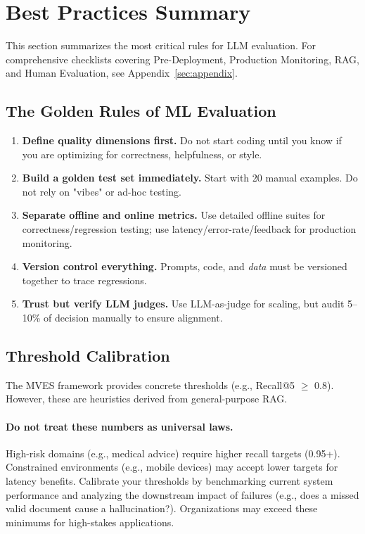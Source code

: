 \section{Best Practices Summary}
\label{sec:checklist}

This section summarizes the most critical rules for LLM evaluation. For comprehensive checklists covering Pre-Deployment, Production Monitoring, RAG, and Human Evaluation, see Appendix~\ref{sec:appendix}.

\subsection{The Golden Rules of ML Evaluation}

\begin{enumerate}[itemsep=4pt, leftmargin=2.5em]
    \item \textbf{Define quality dimensions first.} Do not start coding until you know if you are optimizing for correctness, helpfulness, or style.
    
    \item \textbf{Build a golden test set immediately.} Start with 20 manual examples. Do not rely on "vibes" or ad-hoc testing.
    
    \item \textbf{Separate offline and online metrics.} Use detailed offline suites for correctness/regression testing; use latency/error-rate/feedback for production monitoring.
    
    \item \textbf{Version control everything.} Prompts, code, and \emph{data} must be versioned together to trace regressions.
    
    \item \textbf{Trust but verify LLM judges.} Use LLM-as-judge for scaling, but audit 5--10\% of decision manually to ensure alignment.
\end{enumerate}

\subsection{Threshold Calibration}
\label{sec:thresholds}

The MVES framework provides concrete thresholds (e.g., Recall@5 $\geq$ 0.8). However, these are heuristics derived from general-purpose RAG.

\paragraph{Do not treat these numbers as universal laws.} High-risk domains (e.g., medical advice) require higher recall targets (0.95+). Constrained environments (e.g., mobile devices) may accept lower targets for latency benefits. Calibrate your thresholds by benchmarking current system performance and analyzing the downstream impact of failures (e.g., does a missed valid document cause a hallucination?). Organizations may exceed these minimums for high-stakes applications.
